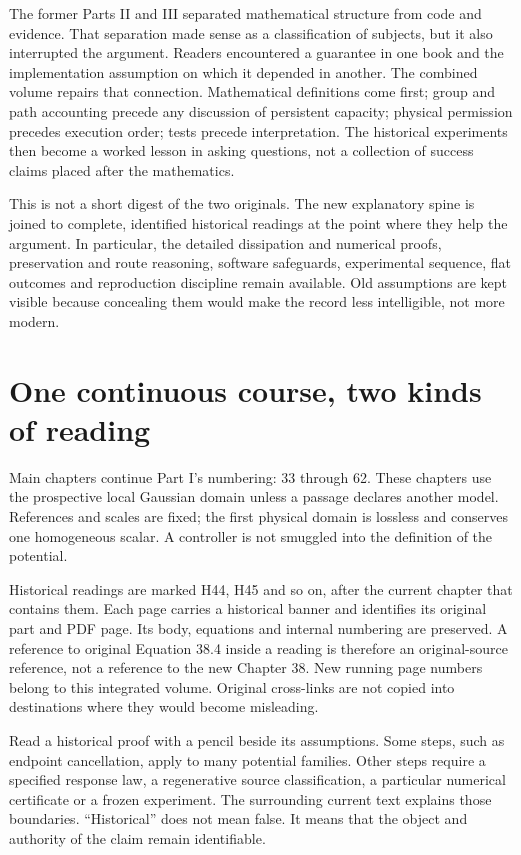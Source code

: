 The former Parts II and III separated mathematical structure from code and
evidence. That separation made sense as a classification of subjects, but it
also interrupted the argument. Readers encountered a guarantee in one book
and the implementation assumption on which it depended in another. The
combined volume repairs that connection. Mathematical definitions come first;
group and path accounting precede any discussion of persistent capacity;
physical permission precedes execution order; tests precede interpretation.
The historical experiments then become a worked lesson in asking questions,
not a collection of success claims placed after the mathematics.

This is not a short digest of the two originals. The new explanatory spine
is joined to complete, identified historical readings at the point where
they help the argument. In particular, the detailed dissipation and numerical
proofs, preservation and route reasoning, software safeguards, experimental
sequence, flat outcomes and reproduction discipline remain available.
Old assumptions are kept visible because concealing them would make the
record less intelligible, not more modern.

\chapter*{One continuous course, two kinds of reading}
Main chapters continue Part I's numbering: 33 through 62. These chapters use
the prospective local Gaussian domain unless a passage declares another
model. References and scales are fixed; the first physical domain is
lossless and conserves one homogeneous scalar. A controller is not smuggled
into the definition of the potential.

Historical readings are marked H44, H45 and so on, after the current chapter
that contains them. Each page carries a historical banner and identifies its
original part and PDF page. Its body, equations and internal numbering are
preserved. A reference to original Equation 38.4 inside a reading is therefore
an original-source reference, not a reference to the new Chapter 38. New
running page numbers belong to this integrated volume. Original cross-links
are not copied into destinations where they would become misleading.

Read a historical proof with a pencil beside its assumptions. Some steps,
such as endpoint cancellation, apply to many potential families. Other steps
require a specified response law, a regenerative source classification, a
particular numerical certificate or a frozen experiment. The surrounding
current text explains those boundaries. ``Historical'' does not mean false.
It means that the object and authority of the claim remain identifiable.

